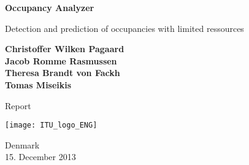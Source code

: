 \begin{titlepage}
	\begin{center}
		\vspace*{1cm}
		
		\Huge
		\textbf{Occupancy Analyzer}
		
		\vspace{0.5cm}
		\LARGE
		Detection and prediction of occupancies with limited ressources
		
		\vspace{1.5cm}
		
		\textbf{
			Christoffer Wilken Pagaard\\
			Jacob Romme Rasmussen\\
			Theresa Brandt von Fackh\\
			Tomas Miseikis\\
		}
		
		\vfill
		
		Report
		
		\vspace{0.8cm}
		
		\texttt{[image: ITU\_logo\_ENG]}
		
		\Large
		Denmark\\
		15. December 2013
		
	\end{center}
\end{titlepage}